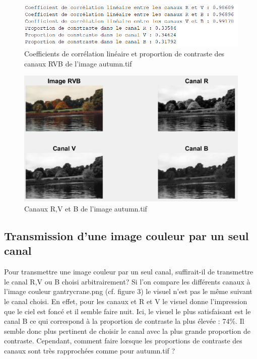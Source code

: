\documentclass[a4paper,12pt]{article}
\theoremstyle{break}
\begin{document}
\begin{figure}[htbp]
	\centering
	\includegraphics{img/TP1_ex1_res.PNG}
	\caption{Coefficients de corrélation linéaire et proportion de contraste des canaux RVB de l'image autumn.tif}
\end{figure}

\begin{figure}[htbp]
	\centering
	\includegraphics[scale=0.47]{img/TP1_ex1_figure_autumn.PNG}
	\caption{Canaux R,V et B de l'image autumn.tif}
\end{figure}

\newpage
\subsection{Transmission d'une image couleur par un seul canal}

Pour transmettre une image couleur par un seul canal, suffirait-il de transmettre le canal R,V ou B choisi arbitrairement? Si l'on compare les différents canaux à l'image couleur gantrycrane.png (cf. figure 3) le visuel n'est pas le même suivant le canal choisi. En effet, pour les canaux et R et V le visuel donne l'impression que le ciel est foncé et il semble faire nuit. Ici, le visuel le plus satisfaisant est le canal B ce qui correspond à la proportion de contraste la plus élevée : 74\%. Il semble donc plus pertinent de choisir le canal avec la plus grande proportion de contraste.
Cependant, comment faire lorsque les proportions de contraste des canaux sont très rapprochées comme pour autumn.tif ?
\end{document}

